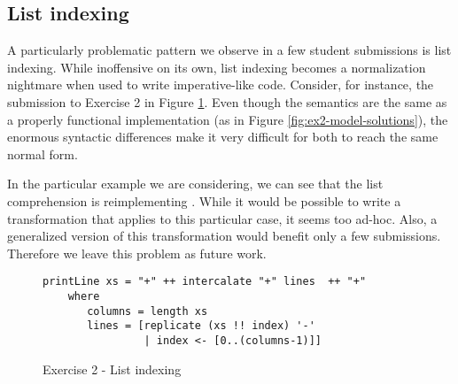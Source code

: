 




\subsection{List indexing}

A particularly problematic pattern we observe in a few student submissions is list indexing. While inoffensive on its own, list indexing becomes a normalization nightmare when used to write imperative-like code. Consider, for instance, the submission to Exercise 2 in Figure \ref{fig:ex2-list-indexing}. Even though the semantics are the same as a properly functional implementation (as in Figure \ref{fig:ex2-model-solutions}), the enormous syntactic differences make it very difficult for both to reach the same normal form.

In the particular example we are considering, we can see that the list comprehension is reimplementing . While it would be possible to write a transformation that applies to this particular case, it seems too ad-hoc. Also, a generalized version of this transformation would benefit only a few submissions. Therefore we leave this problem as future work.


\begin{figure}
\centering
\begin{verbatim}
printLine xs = "+" ++ intercalate "+" lines  ++ "+"
    where
       columns = length xs
       lines = [replicate (xs !! index) '-'
                | index <- [0..(columns-1)]]
\end{verbatim}
\caption{Exercise 2 - List indexing}
\label{fig:ex2-list-indexing}
\end{figure}

